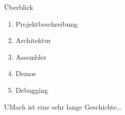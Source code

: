 
\begin{frame}{Überblick}
 \begin{enumerate}
  \item Projektbeschreibung
  \item Architektur
  \item Assembler
  \item Demos
  \item Debugging
 \end{enumerate}
 
 UMach ist eine sehr lange Geschichte\ldots
\end{frame}

